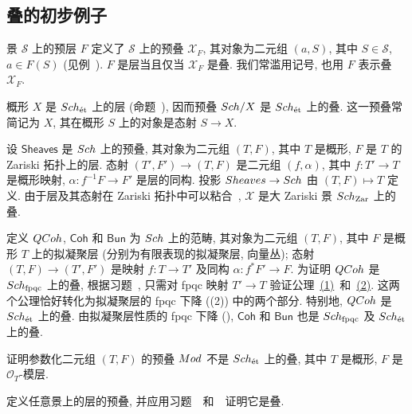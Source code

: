 \subsection{叠的初步例子}\label{src:3.5.2-subsection}
\begin{example}[作为叠的层与概形]\label{src:3.5.7}
景 $\mathcal S$ 上的预层 $F$ 定义了 $\mathcal S$ 上的预叠 $\mathcal X_F$, 其对象为二元组 $(a,S)$, 其中 $S\in\mathcal S$, $a\in F(S)$ (见例~). $F$ 是层当且仅当 $\mathcal X_F$ 是叠. 我们常滥用记号, 也用 $F$ 表示叠 $\mathcal X_F$.

概形 $X$ 是 $Sch_{\text{ét}}$ 上的层 (命题~), 因而预叠 $Sch/X$ 是 $Sch_{\text{ét}}$ 上的叠. 这一预叠常简记为 $X$, 其在概形 $S$ 上的对象是态射 $S\to X$.
\end{example}
\begin{example}[层的叠]\label{src:3.5.8}
设 $\mathsf{Sheaves}$ 是 $Sch$ 上的预叠, 其对象为二元组 $(T,F)$, 其中 $T$ 是概形, $F$ 是 $T$ 的 Zariski 拓扑上的层. 态射 $(T',F')\to(T,F)$ 是二元组 $(f,\alpha)$, 其中 $f:T'\to T$ 是概形映射, $\alpha:f^{-1}F\to F'$ 是层的同构. 投影 $Sheaves\to Sch$ 由 $(T,F)\mapsto T$ 定义. 由于层及其态射在 Zariski 拓扑中可以粘合~\cite[习题 II.1.15 和 22]{Har77}, $\mathcal X$ 是大 Zariski 景 $Sch_{\mathrm{Zar}}$ 上的叠.
\end{example}
\begin{example}[拟凝聚层的叠]\label{src:3.5.9}
定义 $QCoh$, $\mathsf{Coh}$ 和 $\mathsf{Bun}$ 为 $Sch$ 上的范畴, 其对象为二元组 $(T,F)$, 其中 $F$ 是概形 $T$ 上的拟凝聚层 (分别为有限表现的拟凝聚层, 向量丛); 态射 $(T,F)\to(T',F')$ 是映射 $f:T\to T'$ 及同构 $\alpha:f^*F'\to F$.
为证明 $QCoh$ 是 $Sch_{\mathrm{fpqc}}$ 上的叠, 根据习题~, 只需对 fpqc 映射 $T'\to T$ 验证公理~\hyperlink{stack-axiom-1}{(1)}~和~\hyperlink{stack-axiom-2}{(2)}. 这两个公理恰好转化为拟凝聚层的 fpqc 下降 ((2)) 中的两个部分. 特别地, $QCoh$ 是 $Sch_{\text{ét}}$ 上的叠. 由拟凝聚层性质的 fpqc 下降 (), $\mathsf{Coh}$ 和 $\mathsf{Bun}$ 也是 $Sch_{\mathrm{fpqc}}$ 及 $Sch_{\text{ét}}$ 上的叠.
\end{example}
\begin{exercise}[不重要]\label{src:3.5.10}
证明参数化二元组 $(T,F)$ 的预叠 $Mod$ 不是 $Sch_{\text{ét}}$ 上的叠, 其中 $T$ 是概形, $F$ 是 $\mathcal O_T$-模层.
\end{exercise}
\begin{exercise}\label{src:3.5.11}
定义任意景上的层的预叠, 并应用习题~~和~~证明它是叠.
\end{exercise}

